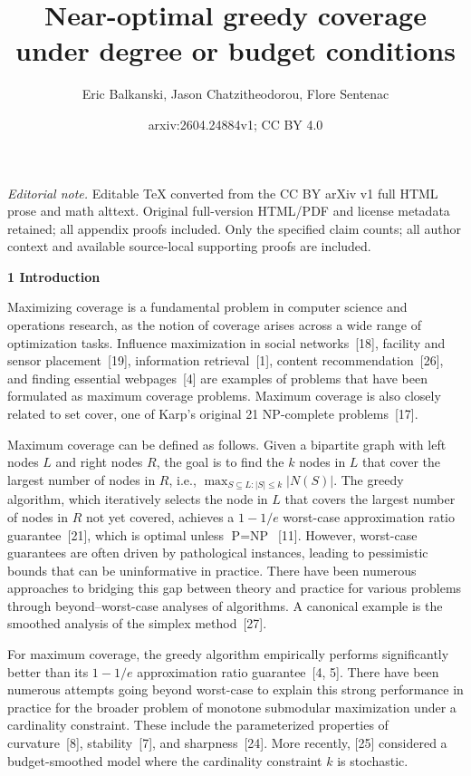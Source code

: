 \documentclass[10pt,a4paper]{article}
\title{Near-optimal greedy coverage under degree or budget conditions}
\author{Eric Balkanski, Jason Chatzitheodorou, Flore Sentenac}
\date{arxiv:2604.24884v1; CC BY 4.0}
\begin{document}
\maketitle
\noindent\textit{Editorial note.} Editable TeX converted from the CC BY arXiv v1 full HTML prose and math alttext. Original full-version HTML/PDF and license metadata retained; all appendix proofs included. Only the specified claim counts; all author context and available source-local supporting proofs are included.\par\medskip


\par\medskip\noindent\textbf{1 Introduction}\par




Maximizing coverage is a fundamental problem in computer science and operations research, as the notion of coverage arises across a wide range of optimization tasks. Influence maximization in social networks [18], facility and sensor placement [19], information retrieval [1], content recommendation [26], and finding essential webpages [4] are examples of problems that have been formulated as maximum coverage problems. Maximum coverage is also closely related to set cover, one of Karp’s original 21 NP-complete problems [17].\par




Maximum coverage can be defined as follows. Given a bipartite graph with left nodes $L$ and right nodes $R$, the goal is to find the $k$ nodes in $L$ that cover the largest number of nodes in $R$, i.e., $\max_{S\subseteq L:|S|\leq k}|N(S)|$.
The greedy algorithm, which iteratively selects the node in $L$ that covers the largest number of nodes in $R$ not yet covered, achieves a $1-1/e$ worst-case approximation ratio guarantee [21], which is optimal unless $\text{P}=\text{NP}$ [11]. However, worst-case guarantees are often driven by pathological instances, leading to pessimistic bounds that can be uninformative in practice. There have been numerous approaches to bridging this gap between theory and practice for various problems through beyond–worst-case analyses of algorithms. A canonical example is the smoothed analysis of the simplex method [27].\par




For maximum coverage, the greedy algorithm empirically performs significantly better than its $1-1/e$
approximation ratio guarantee [4, 5]. There have been numerous attempts going beyond worst-case to explain this strong performance in practice for the broader problem of monotone submodular maximization under a cardinality constraint. These include the parameterized properties of curvature [8], stability [7], and sharpness [24]. More recently, [25] considered a budget-smoothed model where the cardinality constraint $k$ is stochastic.\par
\end{document}

